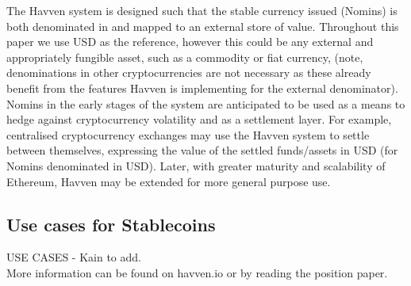 \noindent The Havven system is designed such that the stable currency issued (Nomins) is both denominated in and mapped to an external store of value. Throughout this paper we use USD as the reference, however this could be any external and appropriately fungible asset, such as a commodity or fiat currency, (note, denominations in other cryptocurrencies are not necessary as these already benefit from the features Havven is implementing for the external denominator). \\

\noindent Nomins in the early stages of the system are anticipated to be used as a means to hedge against cryptocurrency volatility and as a settlement layer. For example, centralised cryptocurrency exchanges may use the Havven system to settle between themselves, expressing the value of the settled funds/assets in USD (for Nomins denominated in USD). Later, with greater maturity and scalability of Ethereum, Havven may be extended for more general purpose use. \\

\subsection{Use cases for Stablecoins}
\noindent USE CASES - Kain to add. \\

\noindent More information can be found on havven.io or by reading the position paper.

\pagebreak
